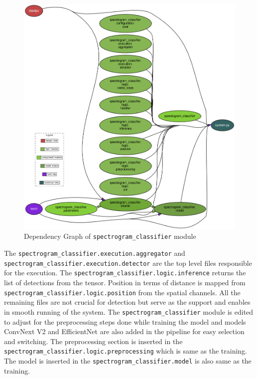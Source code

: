 \begin{figure}[h]
    \centering
    \includegraphics[width=\linewidth]{Bilder/jpg/output_graph.png}
    \caption{Dependency Graph of \texttt{spectrogram\_classifier} module}
    \label{dg_spectrogram}
\end{figure}

The \texttt{spectrogram\_classifier.execution.aggregator} and \texttt{spectrogram\_classifier.execution.detector} are the top level files responsible for the execution. The \texttt{spectrogram\_classifier.logic.inference} returns the list of detections from the tensor. Position in terms of distance is mapped from \texttt{spectrogram\_classifier.logic.position} from the spatial channels. All the remaining files are not crucial for detection but serve as the support and enables in smooth running of the system. The \texttt{spectrogram\_classifier} module is edited to adjust for the preprocessing steps done while training the model and models ConvNext V2 and EfficientNet are also added in the pipeline for easy selection and switching. The preprocessing section is inserted in the \texttt{spectrogram\_classifier.logic.preprocessing} which is same as the training. The model is inserted in the \texttt{spectrogram\_classifier.model} is also same as the training.

